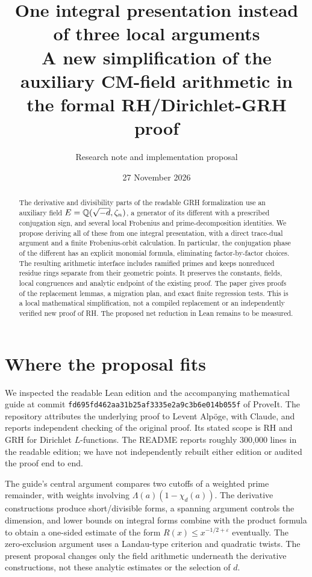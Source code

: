 \documentclass[11pt]{article}
\title{One integral presentation instead of three local arguments\\[4pt]\large A new simplification of the auxiliary CM-field arithmetic in the formal RH/Dirichlet-GRH proof}
\author{Research note and implementation proposal}
\date{27 November 2026}
\begin{document}
\maketitle
\begin{abstract}
The derivative and divisibility parts of the readable GRH formalization use an auxiliary field $E=\mathbb Q(\sqrt{-d},\zeta_n)$, a generator of its different with a prescribed conjugation sign, and several local Frobenius and prime-decomposition identities. We propose deriving all of these from one integral presentation, with a direct trace-dual argument and a finite Frobenius-orbit calculation. In particular, the conjugation phase of the different has an explicit monomial formula, eliminating factor-by-factor choices. The resulting arithmetic interface includes ramified primes and keeps nonreduced residue rings separate from their geometric points. It preserves the constants, fields, local congruences and analytic endpoint of the existing proof. The paper gives proofs of the replacement lemmas, a migration plan, and exact finite regression tests. This is a local mathematical simplification, not a compiled replacement or an independently verified new proof of RH. The proposed net reduction in Lean remains to be measured.
\end{abstract}

\section{Where the proposal fits}
We inspected the readable Lean edition and the accompanying mathematical guide at commit \texttt{fd695fd462aa31b25af3335e2a9c3b6e014b055f} of ProveIt. The repository attributes the underlying proof to Levent Alp\"oge, with Claude, and reports independent checking of the original proof. Its stated scope is RH and GRH for Dirichlet $L$-functions. The README reports roughly 300,000 lines in the readable edition; we have not independently rebuilt either edition or audited the proof end to end.

The guide's central argument compares two cutoffs of a weighted prime remainder, with weights involving $\Lambda(a)(1-\chi_d(a))$. The derivative constructions produce short/divisible forms, a spanning argument controls the dimension, and lower bounds on integral forms combine with the product formula to obtain a one-sided estimate of the form $R(x)\leq x^{-1/2+\varepsilon}$ eventually. The zero-exclusion argument uses a Landau-type criterion and quadratic twists. The present proposal changes only the field arithmetic underneath the derivative constructions, not these analytic estimates or the selection of $d$.
\end{document}
